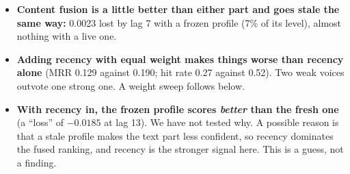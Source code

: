 \documentclass[11pt,a4paper]{article}
\begin{document}
\begin{itemize}
\item \textbf{Content fusion is a little better than either part and goes stale the same way:} 0.0023 lost by lag 7 with a frozen profile (7\% of its level), almost nothing with a live one.
\item \textbf{Adding recency with equal weight makes things worse than recency alone} (MRR 0.129 against 0.190; hit rate 0.27 against 0.52). Two weak voices outvote one strong one. A weight sweep follows below.
\item \textbf{With recency in, the frozen profile scores \emph{better} than the fresh one} (a ``loss'' of $-0.0185$ at lag 13). We have not tested why. A possible reason is that a stale profile makes the text part less confident, so recency dominates the fused ranking, and recency is the stronger signal here. This is a guess, not a finding.
\end{itemize}
\end{document}
